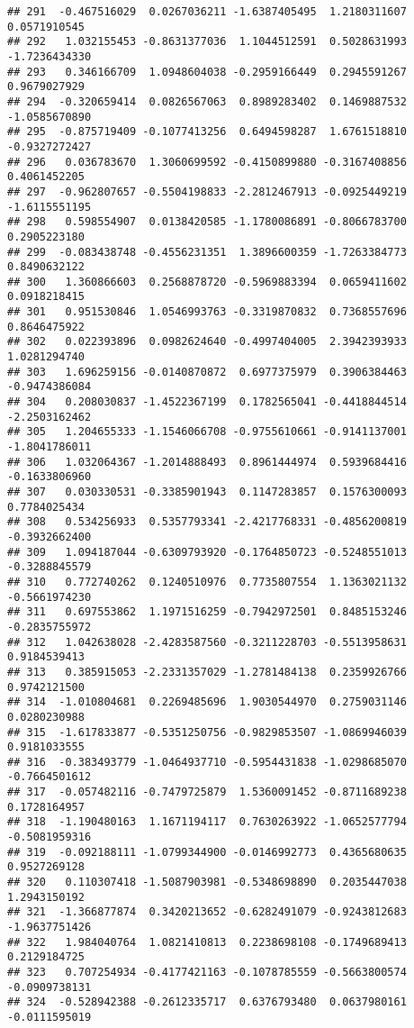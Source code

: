 \documentclass[
]{article}
\begin{document}
\begin{verbatim}
## 291  -0.467516029  0.0267036211 -1.6387405495  1.2180311607  0.0571910545
## 292   1.032155453 -0.8631377036  1.1044512591  0.5028631993 -1.7236434330
## 293   0.346166709  1.0948604038 -0.2959166449  0.2945591267  0.9679027929
## 294  -0.320659414  0.0826567063  0.8989283402  0.1469887532 -1.0585670890
## 295  -0.875719409 -0.1077413256  0.6494598287  1.6761518810 -0.9327272427
## 296   0.036783670  1.3060699592 -0.4150899880 -0.3167408856  0.4061452205
## 297  -0.962807657 -0.5504198833 -2.2812467913 -0.0925449219 -1.6115551195
## 298   0.598554907  0.0138420585 -1.1780086891 -0.8066783700  0.2905223180
## 299  -0.083438748 -0.4556231351  1.3896600359 -1.7263384773  0.8490632122
## 300   1.360866603  0.2568878720 -0.5969883394  0.0659411602  0.0918218415
## 301   0.951530846  1.0546993763 -0.3319870832  0.7368557696  0.8646475922
## 302   0.022393896  0.0982624640 -0.4997404005  2.3942393933  1.0281294740
## 303   1.696259156 -0.0140870872  0.6977375979  0.3906384463 -0.9474386084
## 304   0.208030837 -1.4522367199  0.1782565041 -0.4418844514 -2.2503162462
## 305   1.204655333 -1.1546066708 -0.9755610661 -0.9141137001 -1.8041786011
## 306   1.032064367 -1.2014888493  0.8961444974  0.5939684416 -0.1633806960
## 307   0.030330531 -0.3385901943  0.1147283857  0.1576300093  0.7784025434
## 308   0.534256933  0.5357793341 -2.4217768331 -0.4856200819 -0.3932662400
## 309   1.094187044 -0.6309793920 -0.1764850723 -0.5248551013 -0.3288845579
## 310   0.772740262  0.1240510976  0.7735807554  1.1363021132 -0.5661974230
## 311   0.697553862  1.1971516259 -0.7942972501  0.8485153246 -0.2835755972
## 312   1.042638028 -2.4283587560 -0.3211228703 -0.5513958631  0.9184539413
## 313   0.385915053 -2.2331357029 -1.2781484138  0.2359926766  0.9742121500
## 314  -1.010804681  0.2269485696  1.9030544970  0.2759031146  0.0280230988
## 315  -1.617833877 -0.5351250756 -0.9829853507 -1.0869946039  0.9181033555
## 316  -0.383493779 -1.0464937710 -0.5954431838 -1.0298685070 -0.7664501612
## 317  -0.057482116 -0.7479725879  1.5360091452 -0.8711689238  0.1728164957
## 318  -1.190480163  1.1671194117  0.7630263922 -1.0652577794 -0.5081959316
## 319  -0.092188111 -1.0799344900 -0.0146992773  0.4365680635  0.9527269128
## 320   0.110307418 -1.5087903981 -0.5348698890  0.2035447038  1.2943150192
## 321  -1.366877874  0.3420213652 -0.6282491079 -0.9243812683 -1.9637751426
## 322   1.984040764  1.0821410813  0.2238698108 -0.1749689413  0.2129184725
## 323   0.707254934 -0.4177421163 -0.1078785559 -0.5663800574 -0.0909738131
## 324  -0.528942388 -0.2612335717  0.6376793480  0.0637980161 -0.0111595019

\end{verbatim}
\end{document}
